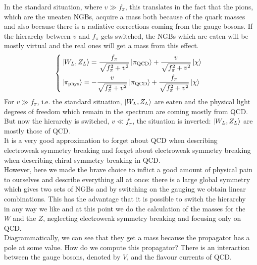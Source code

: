 \documentclass[../main.tex]{subfiles}
\begin{document}
In the standard situation, where $v\gg f_\pi$, this translates in the fact that the pions, which are the uneaten NGBs, acquire a mass both because of the quark masses and also because there is a radiative corrections coming from the gauge bosons. If the hierarchy between $v$ and $f_\pi$ gets switched, the NGBs which are eaten will be mostly virtual and the real ones will get a mass from this effect. 
\[
\left\{
\begin{aligned}
&\ket{W_L,Z_L}=\frac{f_\pi}{\sqrt{f_\pi^2+v^2}}\ket{\pi_{\text{QCD}}}+\frac{v}{\sqrt{f_\pi^2+v^2}}\ket{\chi}\\
&\ket{\pi_{\text{phys}}}=-\frac{v}{\sqrt{f_\pi^2+v^2}}\ket{\pi_{\text{QCD}}}+\frac{f_\pi}{\sqrt{f_\pi^2+v^2}}\ket{\chi}
\end{aligned}
\right.
\]
For $v\gg f_\pi$, i.e. the standard situation, $\ket{W_L,Z_L}$ are eaten and the physical light degrees of freedom which remain in the spectrum are coming mostly from QCD. But now the hierarchy is switched, $v\ll f_\pi$, the situation is inverted: $\ket{W_L,Z_L}$ are mostly those of QCD.\\
It is a very good approximation to forget about QCD when describing electroweak symmetry breaking and forget about electroweak symmetry breaking when describing chiral symmetry breaking in QCD.\\
However, here we made the brave choice to inflict a good amount of physical pain to ourselves and describe everything all at once: there is a large global symmetry which gives two sets of NGBs and by switching on the gauging we obtain linear combinations. This has the advantage that it is possible to switch the hierarchy in any way we like and at this point we do the calculation of the masses for the $W$ and the $Z$, neglecting electroweak symmetry breaking and focusing only on QCD.\\
Diagrammatically, we can see that they get a mass because the propagator has a pole at some value. How do we compute this propagator? There is an interaction between the gauge bosons, denoted by $V$, and the flavour currents of QCD.%
\end{document}
